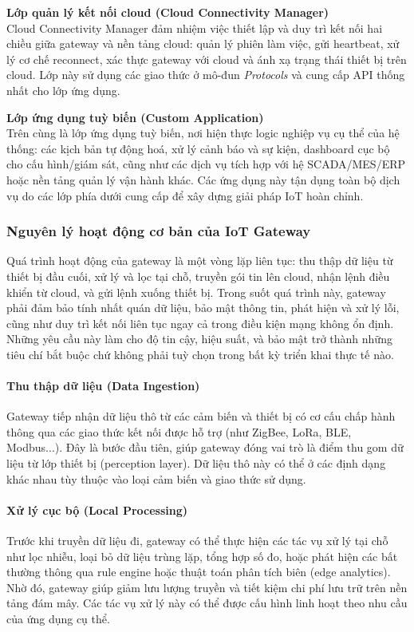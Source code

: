                     \textbf{Lớp quản lý kết nối cloud (Cloud Connectivity Manager)}\\
                        Cloud Connectivity Manager đảm nhiệm việc thiết lập và duy trì kết nối hai chiều giữa gateway và nền tảng cloud: quản lý phiên làm việc, gửi heartbeat, xử lý cơ chế reconnect, xác thực gateway với cloud và ánh xạ trạng thái thiết bị trên cloud. Lớp này sử dụng các giao thức ở mô-đun \emph{Protocols} và cung cấp API thống nhất cho lớp ứng dụng.
                    
                    \textbf{Lớp ứng dụng tuỳ biến (Custom Application)}\\
                        Trên cùng là lớp ứng dụng tuỳ biến, nơi hiện thực logic nghiệp vụ cụ thể của hệ thống: các kịch bản tự động hoá, xử lý cảnh báo và sự kiện, dashboard cục bộ cho cấu hình/giám sát, cũng như các dịch vụ tích hợp với hệ SCADA/MES/ERP hoặc nền tảng quản lý vận hành khác. Các ứng dụng này tận dụng toàn bộ dịch vụ do các lớp phía dưới cung cấp để xây dựng giải pháp IoT hoàn chỉnh.

        \subsubsection{Nguyên lý hoạt động cơ bản của IoT Gateway}
            Quá trình hoạt động của gateway là một vòng lặp liên tục: thu thập dữ liệu từ thiết bị đầu cuối, xử lý và lọc tại chỗ, truyền gói tin lên cloud, nhận lệnh điều khiển từ cloud, và gửi lệnh xuống thiết bị. Trong suốt quá trình này, gateway phải đảm bảo tính nhất quán dữ liệu, bảo mật thông tin, phát hiện và xử lý lỗi, cũng như duy trì kết nối liên tục ngay cả trong điều kiện mạng không ổn định. Những yêu cầu này làm cho độ tin cậy, hiệu suất, và bảo mật trở thành những tiêu chí bắt buộc chứ không phải tuỳ chọn trong bất kỳ triển khai thực tế nào.
                \paragraph{Thu thập dữ liệu (Data Ingestion)}
                    Gateway tiếp nhận dữ liệu thô từ các cảm biến và thiết bị có cơ cấu chấp hành thông qua các giao thức kết nối được hỗ trợ (như ZigBee, LoRa, BLE, Modbus...). Đây là bước đầu tiên, giúp gateway đóng vai trò là điểm thu gom dữ liệu từ lớp thiết bị (perception layer). Dữ liệu thô này có thể ở các định dạng khác nhau tùy thuộc vào loại cảm biến và giao thức sử dụng.
                \paragraph{Xử lý cục bộ (Local Processing)}
                    Trước khi truyền dữ liệu đi, gateway có thể thực hiện các tác vụ xử lý tại chỗ như lọc nhiễu, loại bỏ dữ liệu trùng lặp, tổng hợp số đo, hoặc phát hiện các bất thường thông qua rule engine hoặc thuật toán phân tích biên (edge analytics). Nhờ đó, gateway giúp giảm lưu lượng truyền và tiết kiệm chi phí lưu trữ trên nền tảng đám mây. Các tác vụ xử lý này có thể được cấu hình linh hoạt theo nhu cầu của ứng dụng cụ thể.
